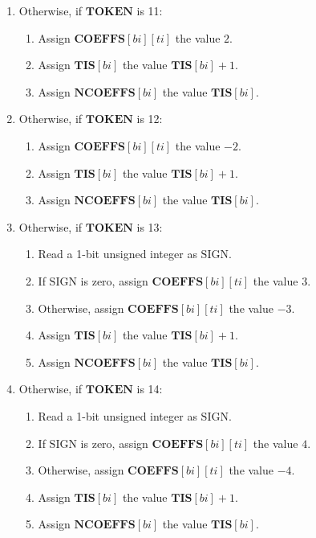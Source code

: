 \documentclass[9pt,letterpaper]{book}
\newcommand{\idx}[1]{{\ensuremath{\mathit{#1}}}}
\newcommand{\bi}{\idx{bi}}
\newcommand{\ti}{\idx{ti}}
\newcommand{\bitvar}[1]{\ensuremath{\mathbf{\bm{#1}}}}
\newcommand{\locvar}[1]{\ensuremath{\mathrm{#1}}}
\numberwithin{equation}{chapter}
\numberwithin{figure}{chapter}
\numberwithin{table}{chapter}
\begin{document}
\begin{enumerate}
\item
Otherwise, if \bitvar{TOKEN} is 11:
\begin{enumerate}
\item
Assign $\bitvar{COEFFS}[\bitvar{\bi}][\bitvar{\ti}]$ the value $2$.
\item
Assign $\bitvar{TIS}[\bitvar{\bi}]$ the value $\bitvar{TIS}[\bitvar{\bi}]+1$.
\item
Assign $\bitvar{NCOEFFS}[\bitvar{\bi}]$ the value $\bitvar{TIS}[\bitvar{\bi}]$.
\end{enumerate}
\item
Otherwise, if \bitvar{TOKEN} is 12:
\begin{enumerate}
\item
Assign $\bitvar{COEFFS}[\bitvar{\bi}][\bitvar{\ti}]$ the value $-2$.
\item
Assign $\bitvar{TIS}[\bitvar{\bi}]$ the value $\bitvar{TIS}[\bitvar{\bi}]+1$.
\item
Assign $\bitvar{NCOEFFS}[\bitvar{\bi}]$ the value $\bitvar{TIS}[\bitvar{\bi}]$.
\end{enumerate}
\item
Otherwise, if \bitvar{TOKEN} is 13:
\begin{enumerate}
\item
Read a 1-bit unsigned integer as \locvar{SIGN}.
\item
If \locvar{SIGN} is zero, assign $\bitvar{COEFFS}[\bitvar{\bi}][\bitvar{\ti}]$
 the value $3$.
\item
Otherwise, assign $\bitvar{COEFFS}[\bitvar{\bi}][\bitvar{\ti}]$ the value $-3$.
\item
Assign $\bitvar{TIS}[\bitvar{\bi}]$ the value $\bitvar{TIS}[\bitvar{\bi}]+1$.
\item
Assign $\bitvar{NCOEFFS}[\bitvar{\bi}]$ the value $\bitvar{TIS}[\bitvar{\bi}]$.
\end{enumerate}
\item
Otherwise, if \bitvar{TOKEN} is 14:
\begin{enumerate}
\item
Read a 1-bit unsigned integer as \locvar{SIGN}.
\item
If \locvar{SIGN} is zero, assign $\bitvar{COEFFS}[\bitvar{\bi}][\bitvar{\ti}]$
 the value $4$.
\item
Otherwise, assign $\bitvar{COEFFS}[\bitvar{\bi}][\bitvar{\ti}]$ the value $-4$.
\item
Assign $\bitvar{TIS}[\bitvar{\bi}]$ the value $\bitvar{TIS}[\bitvar{\bi}]+1$.
\item
Assign $\bitvar{NCOEFFS}[\bitvar{\bi}]$ the value $\bitvar{TIS}[\bitvar{\bi}]$.

\end{enumerate}
\end{enumerate}
\end{document}
